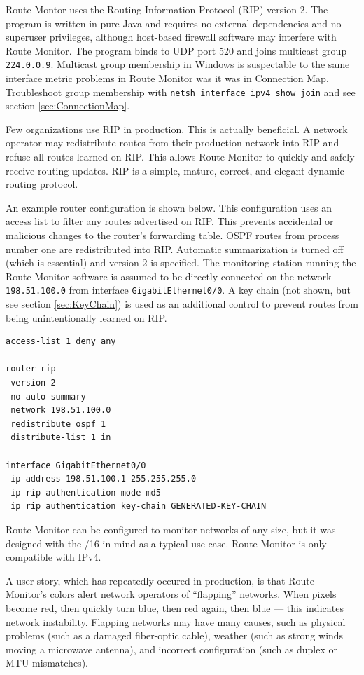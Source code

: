\documentclass[12pt]{article}
\begin{document}
Route Montor uses the Routing Information Protocol (RIP) version 2. The program is written in pure Java and requires no external dependencies and no superuser privileges, although host-based firewall software may interfere with Route Monitor. The program binds to UDP port 520 and joins multicast group \texttt{224.0.0.9}. Multicast group membership in Windows is suspectable to the same interface metric problems in Route Monitor was it was in Connection Map. Troubleshoot group membership with \texttt{netsh interface ipv4 show join} and see section \ref{sec:ConnectionMap}.

Few organizations use RIP in production. This is actually beneficial. A network operator may redistribute routes from their production network into RIP and refuse all routes learned on RIP. This allows Route Monitor to quickly and safely receive routing updates. RIP is a simple, mature, correct, and elegant dynamic routing protocol.

An example router configuration is shown below. This configuration uses an access list to filter any routes advertised on RIP. This prevents accidental or malicious changes to the router's forwarding table. OSPF routes from process number one are redistributed into RIP. Automatic summarization is turned off (which is essential) and version 2 is specified. The monitoring station running the Route Monitor software is assumed to be directly connected on the network \texttt{198.51.100.0} from interface \texttt{GigabitEthernet0/0}. A key chain (not shown, but see section \ref{sec:KeyChain}) is used as an additional control to prevent routes from being unintentionally learned on RIP.

\begin{lstlisting}
access-list 1 deny any

router rip
 version 2
 no auto-summary
 network 198.51.100.0
 redistribute ospf 1
 distribute-list 1 in
 
interface GigabitEthernet0/0
 ip address 198.51.100.1 255.255.255.0
 ip rip authentication mode md5
 ip rip authentication key-chain GENERATED-KEY-CHAIN
\end{lstlisting}

Route Monitor can be configured to monitor networks of any size, but it was designed with the /16 in mind as a typical use case. Route Monitor is only compatible with IPv4.

A user story, which has repeatedly occured in production, is that Route Monitor's colors alert network operators of ``flapping'' networks. When pixels become red, then quickly turn blue, then red again, then blue --- this indicates network instability. Flapping networks may have many causes, such as physical problems (such as a damaged fiber-optic cable), weather (such as strong winds moving a microwave antenna), and incorrect configuration (such as duplex or MTU mismatches).
\end{document}
